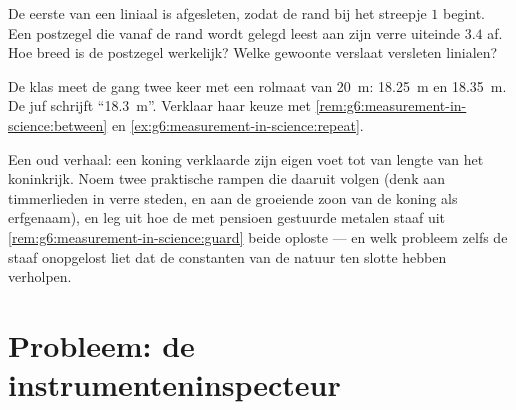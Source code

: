 \begin{exercise}[$\star\star$]\label{exo:g6:measurement-in-science:10}
De eerste  van een liniaal is afgesleten, zodat de rand bij
het streepje $1$ begint. Een postzegel die vanaf de rand wordt gelegd
leest aan zijn verre uiteinde $3.4$ af. Hoe breed is de postzegel
werkelijk? Welke gewoonte verslaat versleten linialen?
\end{exercise}

\begin{exercise}[$\star\star$]\label{exo:g6:measurement-in-science:11}
De klas meet de gang twee keer met een rolmaat van \qty{20}{m}:
\qty{18.25}{m} en \qty{18.35}{m}. De juf schrijft ``\qty{18.3}{m}''.
Verklaar haar keuze met
\cref{rem:g6:measurement-in-science:between} en
\cref{ex:g6:measurement-in-science:repeat}.
\end{exercise}

\begin{exercise}[$\star\star\star$]\label{exo:g6:measurement-in-science:12}
Een oud verhaal: een koning verklaarde zijn eigen voet tot
 van lengte van het koninkrijk. Noem twee praktische rampen
die daaruit volgen (denk aan timmerlieden in verre steden, en aan de
groeiende zoon van de koning als erfgenaam), en leg uit hoe de met
pensioen gestuurde metalen staaf uit
\cref{rem:g6:measurement-in-science:guard} beide oploste --- en welk
probleem zelfs de staaf onopgelost liet dat de constanten van de
natuur ten slotte hebben verholpen.
\end{exercise}

\section{Probleem: de instrumenteninspecteur}

